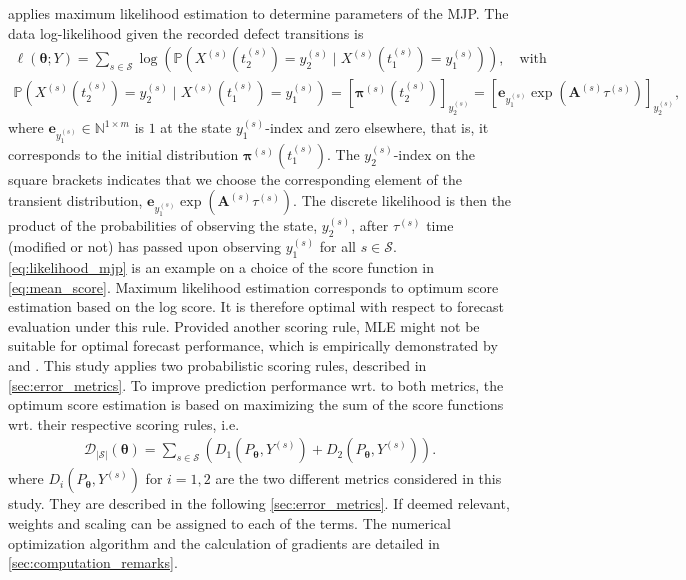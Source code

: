 \documentclass{article}
\begin{document}
\citet{bisgaard2024A} applies maximum likelihood estimation to determine parameters of the MJP.
The data log-likelihood given the recorded defect transitions is 
\begin{equation}
\begin{aligned}
                  \ell\left( \bm{\theta}; Y \right) = 
                  \sum_{s \in \mathcal{S}} \log \left( \mathds{P}\left(X^{(s)}(t_2^{(s)}) = y_2^{(s)} \mid X^{(s)}(t_1^{(s)}) = y_1^{(s)} \right) \right), \quad \text{with} \\ 
                 \mathds{P}\left(X^{(s)}(t_2^{(s)}) = y_2^{(s)} \mid X^{(s)}(t_1^{(s)}) = y_1^{(s)} \right) = \left[ \bm{\pi}^{(s)}\left( t_2^{(s)} \right)  \right]_{ y_2^{(s)}} =  \left[ \bm{e}_{y_{1}^{(s)}}  \exp \left( \bm{A}^{(s)} \tau^{(s)} \right) \right]_{ y_2^{(s)}},
\label{eq:likelihood_mjp}
\end{aligned}     
\end{equation}
where $\bm{e}_{y_{1}^{(s)}} \in \mathbb{N}^{1 \times m}$ is $1$ at the state $y_{1}^{(s)}$-index and zero elsewhere, that is, it corresponds to the initial distribution $\bm{\pi}^{(s)}(t_1^{(s)})$. The $y_2^{(s)}$-index on the square brackets indicates that we choose the corresponding element of the transient distribution, $\bm{e}_{y_{1}^{(s)}}  \exp \left( \bm{A}^{(s)} \tau^{(s)} \right)$. 
The discrete likelihood is then the product of the probabilities of observing the state, $y_2^{(s)}$, after $\tau^{(s)}$ time (modified or not) has passed upon observing $y_1^{(s)}$ for all $s \in \mathcal{S}$.
\cref{eq:likelihood_mjp} is an example on a choice of the score function in \cref{eq:mean_score}.
Maximum likelihood estimation corresponds to optimum score estimation based on the log score. It is therefore optimal with respect to forecast evaluation under this rule. Provided another scoring rule, MLE might not be suitable for optimal forecast performance, which is empirically demonstrated by \citet{Gneiting2005} and \citet{gebetsberger2018a}.
This study applies two probabilistic scoring rules, described in \cref{sec:error_metrics}. To improve prediction performance wrt. to both metrics, the optimum score estimation is based on maximizing the sum of the score functions wrt. their respective scoring rules, i.e.
\begin{align}
     \mathcal{D}_{{|\mathcal{S}|}}(\bm{\theta}) = \sum_{s \in \mathcal{S}} \left( D_1\left(P_{\bm{\theta}}, Y^{(s)}\right) + D_2\left(P_{\bm{\theta}}, Y^{(s)}\right) \right). \label{eq:mean_score_combination}
\end{align}
where $D_i(P_{\bm{\theta}}, Y^{(s)})$ for $i = 1,2$ are the two different metrics considered in this study. They are described in the following \cref{sec:error_metrics}. If deemed relevant, weights and scaling can be assigned to each of the terms. 
The numerical optimization algorithm and the calculation of gradients are detailed in \cref{sec:computation_remarks}.
\end{document}
